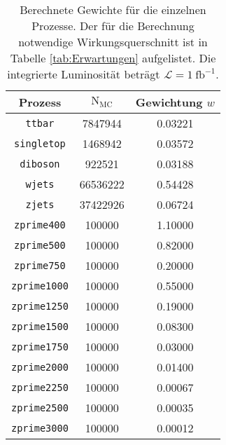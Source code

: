 \begin{table}
    \centering
    \caption{Berechnete Gewichte für die einzelnen Prozesse. Der für die Berechnung notwendige 
    Wirkungsquerschnitt ist in Tabelle \ref{tab:Erwartungen} aufgelistet. Die integrierte 
    Luminosität beträgt $\mathcal{L} = \SI{1}{\femto\barn}^{-1}$.}
    \label{tab:Gewichte}
    \begin{tabular}{c|cc}
    \toprule 
    Prozess & $\text{N}_\text{MC}$ & Gewichtung $w$ \\
    \midrule
    \texttt{ttbar}      & 7847944    & 0.03221     \\
    \texttt{singletop}  & 1468942    & 0.03572     \\
    \texttt{diboson}    & 922521     & 0.03188     \\
    \texttt{wjets}      & 66536222   & 0.54428     \\
    \texttt{zjets}      & 37422926   & 0.06724     \\
    \texttt{zprime400}  & 100000     & 1.10000     \\
    \texttt{zprime500}  & 100000     & 0.82000     \\
    \texttt{zprime750}  & 100000     & 0.20000     \\
    \texttt{zprime1000} & 100000     & 0.55000     \\
    \texttt{zprime1250} & 100000     & 0.19000     \\
    \texttt{zprime1500} & 100000     & 0.08300     \\
    \texttt{zprime1750} & 100000     & 0.03000     \\
    \texttt{zprime2000} & 100000     & 0.01400     \\
    \texttt{zprime2250} & 100000     & 0.00067     \\
    \texttt{zprime2500} & 100000     & 0.00035     \\
    \texttt{zprime3000} & 100000     & 0.00012     \\
    \bottomrule 
    \end{tabular}
\end{table}
